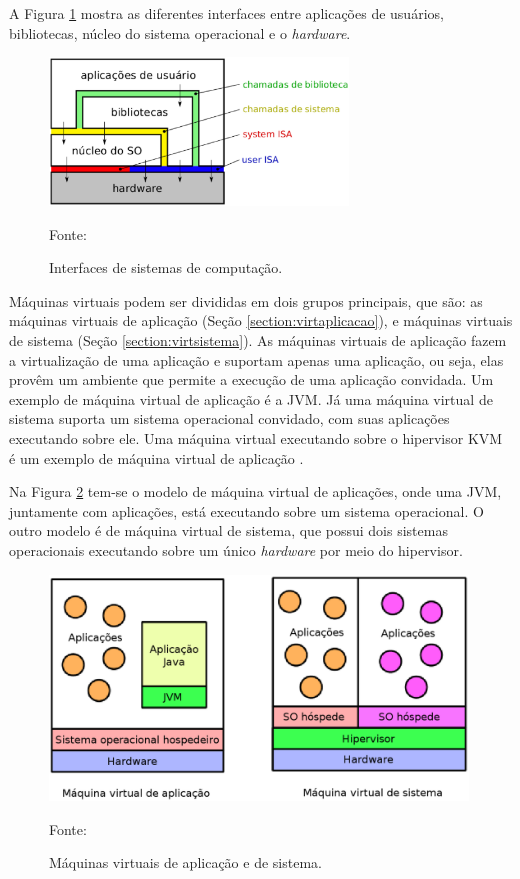 A Figura \ref{fig:interfaces_isa} mostra as diferentes interfaces entre aplicações de usuários, bibliotecas, núcleo do sistema operacional e o 
\textit{hardware}.

\begin{figure}[h!]
 \centering
 \includegraphics[width=300px]{img/interfaces_isa.eps}
 \caption{Interfaces de sistemas de computação.}
 \label{fig:interfaces_isa}
 Fonte: \citet{maziero2013}
\end{figure}

Máquinas virtuais podem ser divididas em dois grupos principais, que são: as máquinas virtuais de aplicação (Seção \ref{section:virtaplicacao}), 
e máquinas virtuais de sistema (Seção \ref{section:virtsistema}). As máquinas virtuais de aplicação fazem a virtualização de uma aplicação e 
suportam apenas uma aplicação, ou seja, elas provêm um ambiente que permite a execução de uma aplicação convidada. Um exemplo de máquina 
virtual de aplicação é a \ac{JVM}. Já uma máquina virtual de sistema suporta um sistema operacional convidado, com suas aplicações executando 
sobre ele. Uma máquina virtual executando sobre o hipervisor \ac{KVM} é um exemplo de máquina virtual de aplicação \cite{laureano2008}.

Na Figura \ref{fig:vms_tipos} tem-se o modelo de máquina virtual de aplicações, onde uma \ac{JVM}, juntamente com aplicações, está executando 
sobre um sistema operacional. O outro modelo é de máquina virtual de sistema, que possui dois sistemas operacionais executando sobre um único 
\textit{hardware} por meio do hipervisor.

\begin{figure}[h!]
 \centering
 \includegraphics[width=420px]{img/vms_tipos.eps}
 \caption{Máquinas virtuais de aplicação e de sistema.}
 \label{fig:vms_tipos}
 Fonte: \citet{laureano2008}
\end{figure}

